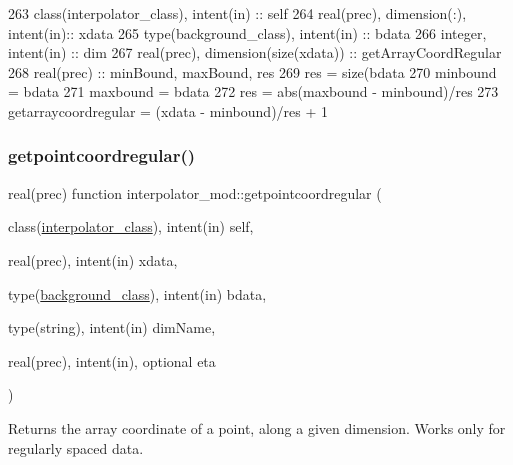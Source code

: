\begin{DoxyCode}
263     \textcolor{keywordtype}{class}(interpolator\_class), \textcolor{keywordtype}{intent(in)} :: self
264     \textcolor{keywordtype}{real(prec)}, \textcolor{keywordtype}{dimension(:)}, \textcolor{keywordtype}{intent(in)}:: xdata
265     \textcolor{keywordtype}{type}(background\_class), \textcolor{keywordtype}{intent(in)} :: bdata
266     \textcolor{keywordtype}{integer}, \textcolor{keywordtype}{intent(in)} :: dim
267     \textcolor{keywordtype}{real(prec)}, \textcolor{keywordtype}{dimension(size(xdata))} :: getArrayCoordRegular
268     \textcolor{keywordtype}{real(prec)} :: minBound, maxBound, res
269     res = \textcolor{keyword}{size}(bdata%
270     minbound = bdata%
271     maxbound = bdata%
272     res = abs(maxbound - minbound)/res
273     getarraycoordregular = (xdata - minbound)/res + 1
\end{DoxyCode}
\mbox{\label{namespaceinterpolator__mod_ab47cccb1adf61dcfca1b1ca5a5d213cd}} 
\subsubsection{\texorpdfstring{getpointcoordregular()}{getpointcoordregular()}}
{\footnotesize\ttfamily real(prec) function interpolator\+\_\+mod\+::getpointcoordregular (\begin{DoxyParamCaption}\item[{class(\mbox{\hyperlink{structinterpolator__mod_1_1interpolator__class}{interpolator\+\_\+class}}), intent(in)}]{self,  }\item[{real(prec), intent(in)}]{xdata,  }\item[{type(\mbox{\hyperlink{structbackground__mod_1_1background__class}{background\+\_\+class}}), intent(in)}]{bdata,  }\item[{type(string), intent(in)}]{dim\+Name,  }\item[{real(prec), intent(in), optional}]{eta }\end{DoxyParamCaption})\hspace{0.3cm}{\ttfamily [private]}}



Returns the array coordinate of a point, along a given dimension. Works only for regularly spaced data. 

